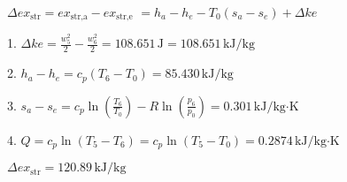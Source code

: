 \( \Delta ex_{\text{str}} = ex_{\text{str,a}} - ex_{\text{str,e}} \)  
\( = h_a - h_e - T_0 \left( s_a - s_e \right) + \Delta ke \)  

1. \( \Delta ke = \frac{w_5^2}{2} - \frac{w_6^2}{2} = 108.651 \, \text{J} = 108.651 \, \text{kJ/kg} \)  

2. \( h_a - h_e = c_p \left( T_6 - T_0 \right) = 85.430 \, \text{kJ/kg} \)  

3. \( s_a - s_e = c_p \ln \left( \frac{T_6}{T_0} \right) - R \ln \left( \frac{p_6}{p_0} \right) = 0.301 \, \text{kJ/kg·K} \)  

4. \( Q = c_p \ln \left( T_5 - T_6 \right) = c_p \ln \left( T_5 - T_0 \right) = 0.2874 \, \text{kJ/kg·K} \)  

\( \Delta ex_{\text{str}} = 120.89 \, \text{kJ/kg} \)